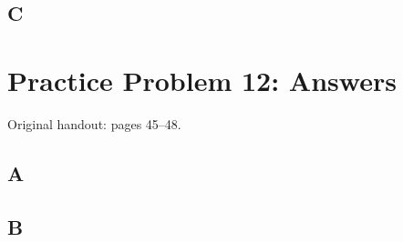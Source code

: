 \documentclass[letterpaper,12pt]{article}
\newcommand{\handout}[1]{%
  
}
\newenvironment{answer}{\par}{\par\medskip}
\begin{document}
\subsection*{C}
\begin{answer}
  \vspace{2cm}
\end{answer}

\clearpage

\handout{45-48}
\section*{Practice Problem 12: Answers}
\noindent Original handout: pages 45--48.\par

\subsection*{A}
\begin{answer}
  \vspace{2cm}
\end{answer}

\subsection*{B}
\begin{answer}
  \vspace{2cm}
\end{answer}

\clearpage
\end{document}
